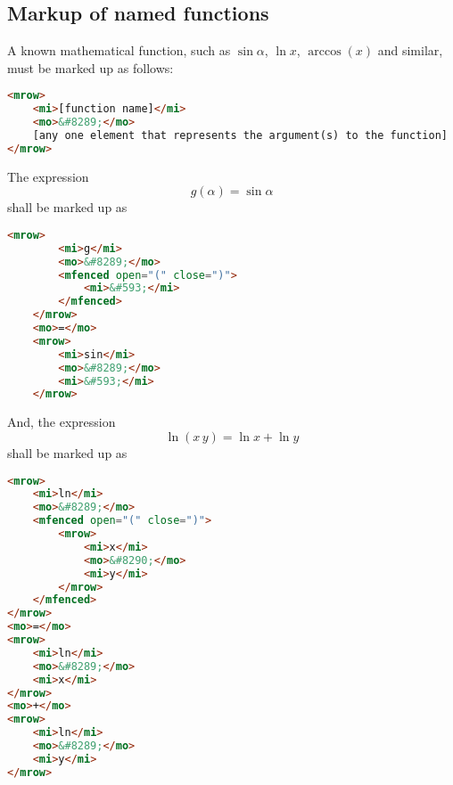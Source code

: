 \documentclass[english,a4paper,11pt]{article}
\begin{document}
\subsection{Markup of named functions}\label{named-functions}
A known mathematical function, such as $\sin \alpha$, $\ln x$, $\arccos(x)$ and similar, must be marked up as follows:
\begin{lstlisting}[language=HTML]
<mrow>
	<mi>[function name]</mi>
	<mo>&#8289;</mo>
	[any one element that represents the argument(s) to the function]
</mrow>
\end{lstlisting}


\begin{examples}
	The expression 
	\begin{equation}g(\alpha) = \sin \alpha\end{equation}
	shall be marked up as
	\begin{lstlisting}[language=HTML]
	<mrow>
		<mi>g</mi>
		<mo>&#8289;</mo>
		<mfenced open="(" close=")">
			<mi>&#593;</mi>
		</mfenced>
	</mrow>
	<mo>=</mo>
	<mrow>
		<mi>sin</mi>
		<mo>&#8289;</mo>
		<mi>&#593;</mi>
	</mrow>
	\end{lstlisting}

And, the expression 
\begin{equation}
\ln (x\, y) = \ln x + \ln y
\end{equation}
shall be marked up as
\begin{lstlisting}[language=HTML]
<mrow>
	<mi>ln</mi>
	<mo>&#8289;</mo>
	<mfenced open="(" close=")">
		<mrow>
			<mi>x</mi>
			<mo>&#8290;</mo>
			<mi>y</mi>
		</mrow>
	</mfenced>
</mrow>
<mo>=</mo>
<mrow>
	<mi>ln</mi>
	<mo>&#8289;</mo>
	<mi>x</mi>
</mrow>
<mo>+</mo>
<mrow>
	<mi>ln</mi>
	<mo>&#8289;</mo>
	<mi>y</mi>
</mrow>
\end{lstlisting}
\end{examples}
\end{document}
